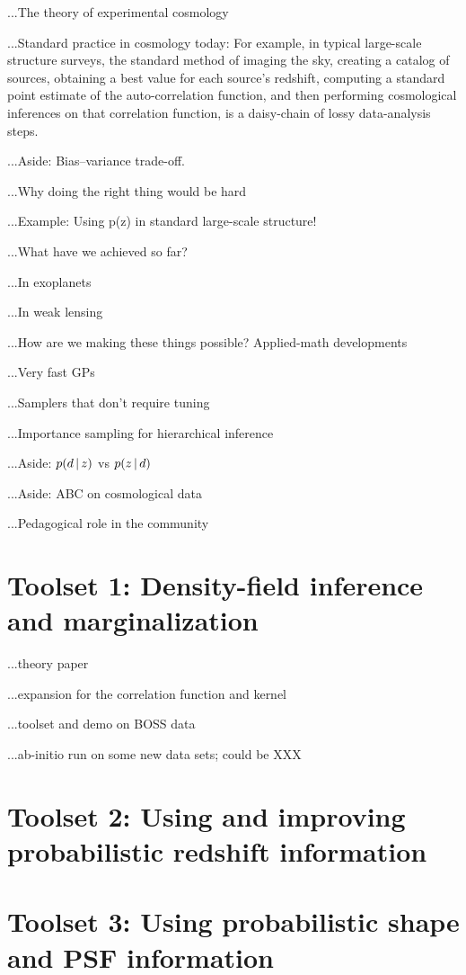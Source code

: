 \documentclass[12pt]{article}
\begin{document}
\sloppy\sloppypar

...The theory of experimental cosmology

...Standard practice in cosmology today:
For example, in typical large-scale structure surveys, the standard
method of imaging the sky, creating a catalog of sources, obtaining a
best value for each source's redshift, computing a standard point
estimate of the auto-correlation function, and then performing
cosmological inferences on that correlation function, is a daisy-chain
of lossy data-analysis steps.

...Aside:  Bias--variance trade-off.

...Why doing the right thing would be hard

...Example:  Using p(z) in standard large-scale structure!

...What have we achieved so far?

...In exoplanets

...In weak lensing

...How are we making these things possible?  Applied-math developments

...Very fast GPs

...Samplers that don't require tuning

...Importance sampling for hierarchical inference

...Aside:  $p(d\,|\, z)$ vs $p(z\,|\, d)$

...Aside:  ABC on cosmological data

...Pedagogical role in the community

\section*{Toolset 1: Density-field inference and marginalization}

...theory paper

...expansion for the correlation function and kernel

...toolset and demo on BOSS data

...ab-initio run on some new data sets; could be XXX

\section*{Toolset 2: Using and improving probabilistic redshift information}

\section*{Toolset 3: Using probabilistic shape and PSF information}
\end{document}
